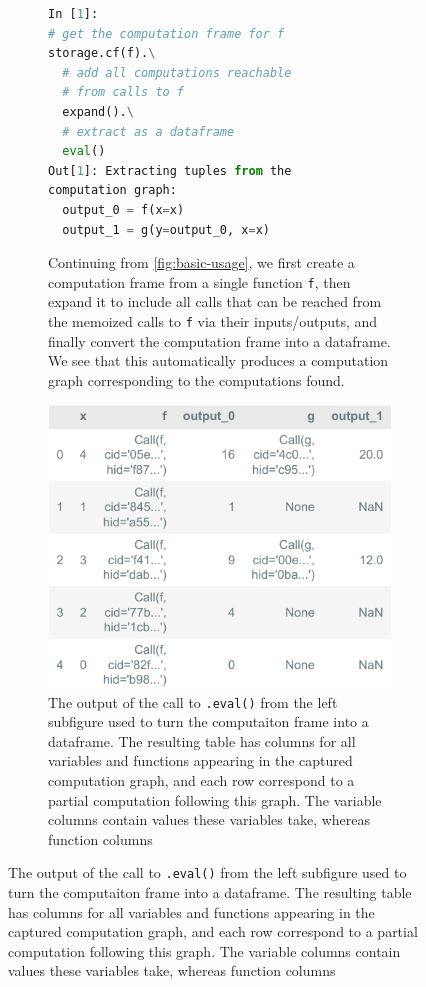 \begin{figure}[htbp]
    \centering
    \begin{subfigure}[b]{\textwidth}
        \centering
        \begin{lstlisting}[language=python]
In [1]:
# get the computation frame for f
storage.cf(f).\
  # add all computations reachable
  # from calls to f
  expand().\
  # extract as a dataframe
  eval()
Out[1]: Extracting tuples from the
computation graph:
  output_0 = f(x=x)
  output_1 = g(y=output_0, x=x)
        \end{lstlisting}
        \caption{Continuing from \autoref{fig:basic-usage}, we first
        create a computation frame from a single function \texttt{f}, then
        expand it to include all calls that can be reached from the memoized
        calls to \texttt{f} via their inputs/outputs, and finally convert
        the computation frame into a dataframe. We see that this
        automatically produces a computation graph corresponding to the
        computations found.}
        \label{fig:figure1}
    \end{subfigure}
    \begin{subfigure}[b]{\textwidth}
        \centering
        \includegraphics[width=0.80\linewidth]{img/fig5.pdf}
        \caption{The output of the call to \texttt{.eval()} from the left
        subfigure used to turn the computaiton frame into a dataframe. The
        resulting table has columns for all variables and functions
        appearing in the captured computation graph, and each row correspond
        to a partial computation following this graph. The variable columns
        contain values these variables take, whereas function columns
}
\end{subfigure}
\end{figure}
